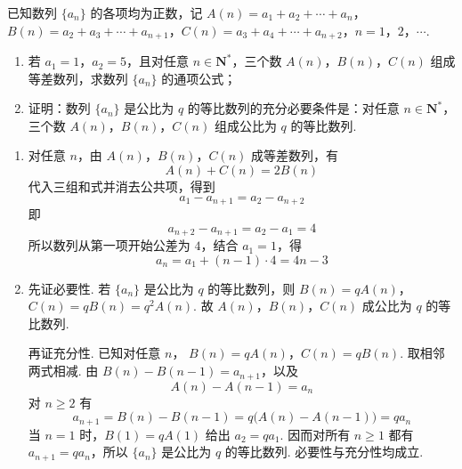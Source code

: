 \begin{problem}
已知数列 \(\{a_n\}\) 的各项均为正数，记 \(A(n)=a_1+a_2+\cdots+a_n\)，\(B(n)=a_2+a_3+\cdots+a_{n+1}\)，\(C(n)=a_3+a_4+\cdots+a_{n+2}\)，\(n=1\)，\(2\)，\(\cdots\).

\begin{enumerate}
\item 若 \(a_1=1\)，\(a_2=5\)，且对任意 \(n\in\mathbf{N}^*\)，三个数 \(A(n)\)，\(B(n)\)，\(C(n)\) 组成等差数列，求数列 \(\{a_n\}\) 的通项公式；
\item 证明：数列 \(\{a_n\}\) 是公比为 \(q\) 的等比数列的充分必要条件是：对任意 \(n\in\mathbf{N}^*\)，三个数 \(A(n)\)，\(B(n)\)，\(C(n)\) 组成公比为 \(q\) 的等比数列.
\end{enumerate}

\begin{solution}
\begin{enumerate}
\item 对任意 \(n\)，由 \(A(n)\)，\(B(n)\)，\(C(n)\) 成等差数列，有
\[
A(n)+C(n)=2B(n)
\]
代入三组和式并消去公共项，得到
\[
a_1-a_{n+1}=a_2-a_{n+2}
\]
即
\[
a_{n+2}-a_{n+1}=a_2-a_1=4
\]
所以数列从第一项开始公差为 \(4\)，结合 \(a_1=1\)，得
\[
a_n=a_1+(n-1)\cdot4=4n-3
\]

\item 先证必要性. 若 \(\{a_n\}\) 是公比为 \(q\) 的等比数列，则
\(B(n)=qA(n)\)，\(C(n)=qB(n)=q^2A(n)\).
故 \(A(n)\)，\(B(n)\)，\(C(n)\) 成公比为 \(q\) 的等比数列.

再证充分性. 已知对任意 \(n\)，
\(B(n)=qA(n)\)，\(C(n)=qB(n)\).
取相邻两式相减. 由 \(B(n)-B(n-1)=a_{n+1}\)，以及
\[
A(n)-A(n-1)=a_n
\]
对 \(n\geqslant2\) 有
\[
a_{n+1}=B(n)-B(n-1)
=q\bigl(A(n)-A(n-1)\bigr)
=qa_n
\]
当 \(n=1\) 时，\(B(1)=qA(1)\) 给出 \(a_2=qa_1\). 因而对所有 \(n\geqslant1\) 都有 \(a_{n+1}=qa_n\)，所以 \(\{a_n\}\) 是公比为 \(q\) 的等比数列. 必要性与充分性均成立.
\end{enumerate}
\end{solution}
\end{problem}

